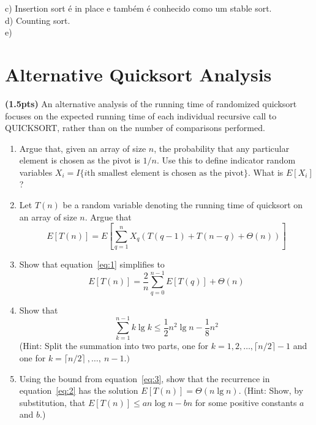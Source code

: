 \documentclass{article}
\begin{document}
c) Insertion sort é in place e também é conhecido como um stable sort.
\\

d) Counting sort. 
\\

e)


\section{Alternative Quicksort Analysis} 
\textbf{(1.5pts)} An alternative analysis of the running time of randomized quicksort focuses on the expected running time of each individual recursive call to QUICKSORT, rather than on the number of comparisons performed.

\begin{enumerate}[label=(\alph*)]
  \item Argue that, given an array of size $n$, the probability that any particular element is chosen as the pivot is $1/n$. Use this to define indicator random variables $X_i = I \{i\mbox{th smallest element is chosen as the pivot}\}$. What is $E[X_i]$?
  \item Let $T(n)$ be a random variable denoting the running time of quicksort on an array of size $n$. Argue that
  \begin{equation}
    E[T(n)]=E\left[\sum_{q=1}^{n}X_q(T(q-1)+T(n-q)+\Theta(n))\right]  
    \label{eq:1}
  \end{equation}
  
  \item Show that equation~\ref{eq:1} simplifies to
  \begin{equation}
    E[T(n)] = \frac{2}{n}\sum_{q=0}^{n-1}E[T(q)] + \Theta(n)
    \label{eq:2}
  \end{equation}

  \item Show that
  \begin{equation}
    \sum_{k=1}^{n-1} k \lg k \leq \frac{1}{2}n^2\lg n - \frac{1}{8}n^2
    \label{eq:3}
  \end{equation}
  (Hint: Split the summation into two parts, one for $k=1,2, \ldots, \lceil n/2 \rceil - 1$ and \\ one for $k=\lceil n/2 \rceil~,\ldots,~n-1.)$

  \item Using the bound from equation~\ref{eq:3}, show that the recurrence in equation~\ref{eq:2} has the solution $E[T(n)]=\Theta(n\lg n)$. (Hint: Show, by substitution, that $E[T(n)] \leq an \log n - bn$ for some positive constants $a$ and $b$.)
\end{enumerate}
\end{document}
